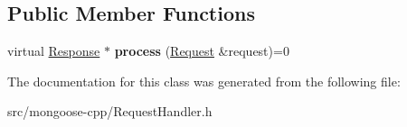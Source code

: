 \subsection*{Public Member Functions}
\begin{DoxyCompactItemize}
\item 
virtual \hyperlink{classMongoose_1_1Response}{Response} $\ast$ {\bfseries process} (\hyperlink{classMongoose_1_1Request}{Request} \&request)=0\hypertarget{classMongoose_1_1RequestHandlerBase_a661bde6661622537cab6250f82baa91c}{}\label{classMongoose_1_1RequestHandlerBase_a661bde6661622537cab6250f82baa91c}

\end{DoxyCompactItemize}


The documentation for this class was generated from the following file\+:\begin{DoxyCompactItemize}
\item 
src/mongoose-\/cpp/Request\+Handler.\+h\end{DoxyCompactItemize}
